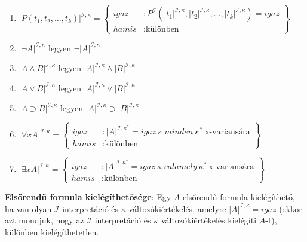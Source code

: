\documentclass[tikz,12pt,margin=0px]{article}
\begin{document}
 	\begin{enumerate}
 		\item	$|P(t_{1}, t_{2}, \ldots, t_{k})|^{\mathcal{I},\kappa} = \left\{
		 		\begin{array}{lr}
		 		igaz & : P^{\mathcal{I}}(|t_{1}|^{\mathcal{I},\kappa}, |t_{2}|^{\mathcal{I},\kappa}, \ldots, |t_{k}|^{\mathcal{I},\kappa}) = igaz\\
		 		hamis & : \text{különben}
		 		\end{array}
	 		\right\}$
	 		
	 	\item	$|\neg A|^{\mathcal{I},\kappa}$ legyen $\neg |A|^{\mathcal{I},\kappa}$
	 	
	 	\item	$|A \wedge B|^{\mathcal{I},\kappa}$ legyen $|A|^{\mathcal{I},\kappa} \wedge |B|^{\mathcal{I},\kappa}$
	 	
	 	\item	$|A \vee B|^{\mathcal{I},\kappa}$ legyen $|A|^{\mathcal{I},\kappa} \vee |B|^{\mathcal{I},\kappa}$
	 	
	 	\item	$|A \supset B|^{\mathcal{I},\kappa}$ legyen $|A|^{\mathcal{I},\kappa} \supset |B|^{\mathcal{I},\kappa}$
	 	
	 	\item	$|\forall x A|^{\mathcal{I},\kappa} = \left\{
	 	\begin{array}{lr}
	 	igaz & : |A|^{\mathcal{I},\kappa^{*}} = igaz \ \kappa \ minden \ \kappa^{*} \ \text{x-variansára} \\
	 	hamis & : \text{különben}
	 	\end{array}
	 	\right\}$
	 	
	 	\item	$|\exists x A|^{\mathcal{I},\kappa} = \left\{
	 	\begin{array}{lr}
	 	igaz & : |A|^{\mathcal{I},\kappa^{*}} = igaz \ \kappa \ valamely \ \kappa^{*} \ \text{x-variansára} \\
	 	hamis & : \text{különben}
	 	\end{array}
	 	\right\}$
	 	
 	\end{enumerate}
	
    \noindent \textbf{Elsőrendű formula kielégíthetősége}: Egy $A$ elsőrendű formula kielégíthető, ha van olyan $\mathcal{I}$ interpretáció és $\kappa$ változókiértékelés, amelyre $|A|^{\mathcal{I},\kappa} = igaz$ (ekkor azt mondjuk, hogy az $\mathcal{I}$ interpretáció és $\kappa$ változókiértékelés kielégíti $A$-t),
	különben kielégíthetetlen.\\
	
\end{document}
